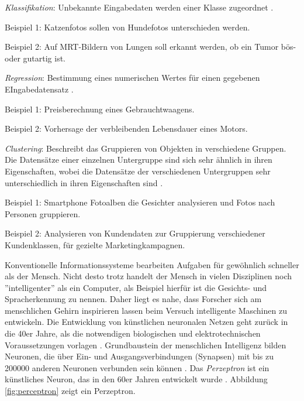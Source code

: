 \begin{itemize*}

\item \emph{Klassifikation}: Unbekannte Eingabedaten werden einer Klasse zugeordnet \cite [vgl. S. 68]{EM17}. 
\begin{itemize*}
\item Beispiel 1: Katzenfotos sollen von Hundefotos unterschieden werden.
\item Beispiel 2: Auf MRT-Bildern von Lungen soll erkannt werden, ob ein Tumor bös- oder gutartig ist.
\end{itemize*}
\item \emph{Regression}: Bestimmung eines numerischen Wertes für einen gegebenen EIngabedatensatz \cite {SG17}.   
\begin{itemize*}
\item Beispiel 1: Preisberechnung eines Gebrauchtwaagens.  
\item Beispiel 2: Vorhersage der verbleibenden Lebensdauer eines Motors.
\end{itemize*}
\item \emph{Clustering}: Beschreibt das Gruppieren von Objekten in verschiedene Gruppen. Die Datensätze einer einzelnen Untergruppe sind sich sehr ähnlich in ihren Eigenschaften, wobei die Datensätze der verschiedenen Untergruppen sehr unterschiedlich in ihren Eigenschaften sind \cite {SG17}.   
\begin{itemize*}
\item Beispiel 1: Smartphone Fotoalben die Gesichter analysieren und Fotos nach Personen gruppieren.  
\item Beispiel 2: Analysieren von Kundendaten zur Gruppierung verschiedener Kundenklassen, für gezielte Marketingkampagnen. 
\end{itemize*}

\end{itemize*}   

Konventionelle Informationssysteme bearbeiten Aufgaben für gewöhnlich schneller als der Mensch. Nicht desto trotz handelt der Mensch in vielen Disziplinen noch ''intelligenter'' als ein Computer, als Beispiel hierfür ist die Gesichts- und Spracherkennung zu nennen. Daher liegt es nahe, dass Forscher sich am menschlichen Gehirn inspirieren lassen beim Versuch intelligente Maschinen zu entwickeln. Die Entwicklung von künstlichen neuronalen Netzen geht zurück in die 40er Jahre, als die notwendigen biologischen und elektrotechnischen Voraussetzungen vorlagen \cite [vgl. S. 1]{HS97}. Grundbaustein der menschlichen Intelligenz bilden Neuronen, die über Ein- und Ausgangsverbindungen (Synapsen) mit bis zu 200000 anderen Neuronen verbunden sein können \cite [vgl. S. 5]{SS97}. Das \textit{Perzeptron} ist ein künstliches Neuron, das in den 60er Jahren entwickelt wurde \cite [vgl. S. 86]{EA16}. Abbildung \ref{fig:perceptron} zeigt ein Perzeptron. 

